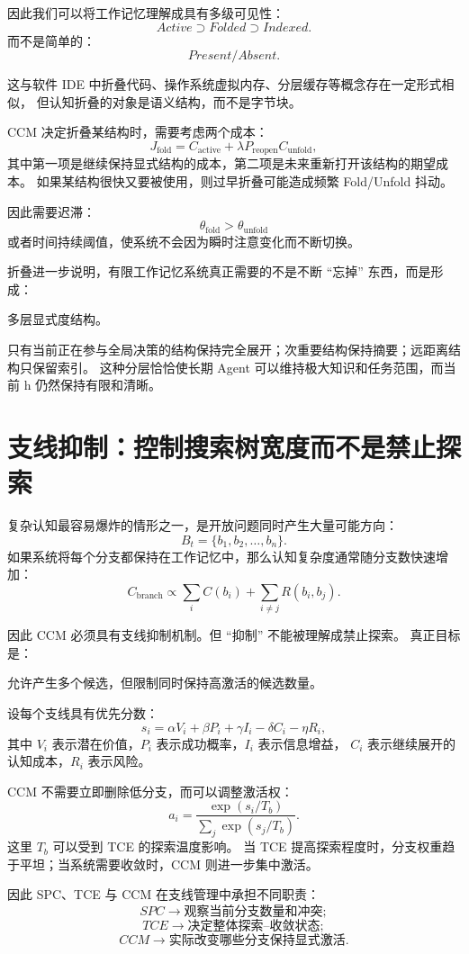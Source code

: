 因此我们可以将工作记忆理解成具有多级可见性：
\[
Active
\supset
Folded
\supset
Indexed.
\]
而不是简单的：
\[
Present/Absent.
\]

这与软件 IDE 中折叠代码、操作系统虚拟内存、分层缓存等概念存在一定形式相似，
但认知折叠的对象是语义结构，而不是字节块。

CCM 决定折叠某结构时，需要考虑两个成本：
\[
J_{\mathrm{fold}}
=
C_{\mathrm{active}}
+
\lambda P_{\mathrm{reopen}}C_{\mathrm{unfold}},
\]
其中第一项是继续保持显式结构的成本，第二项是未来重新打开该结构的期望成本。
如果某结构很快又要被使用，则过早折叠可能造成频繁 Fold/Unfold 抖动。

因此需要迟滞：
\[
\theta_{\mathrm{fold}}
>
\theta_{\mathrm{unfold}}
\]
或者时间持续阈值，使系统不会因为瞬时注意变化而不断切换。

折叠进一步说明，有限工作记忆系统真正需要的不是不断 ``忘掉'' 东西，而是形成：
\begin{statementbox}
多层显式度结构。
\end{statementbox}
只有当前正在参与全局决策的结构保持完全展开；次重要结构保持摘要；远距离结构只保留索引。
这种分层恰恰使长期 Agent 可以维持极大知识和任务范围，而当前 h 仍然保持有限和清晰。


\section{支线抑制：控制搜索树宽度而不是禁止探索}

复杂认知最容易爆炸的情形之一，是开放问题同时产生大量可能方向：
\[
B_t
=
\{b_1,b_2,\ldots,b_n\}.
\]
如果系统将每个分支都保持在工作记忆中，那么认知复杂度通常随分支数快速增加：
\[
C_{\mathrm{branch}}
\propto
\sum_i C(b_i)
+
\sum_{i\neq j}R(b_i,b_j).
\]

因此 CCM 必须具有支线抑制机制。但 ``抑制'' 不能被理解成禁止探索。
真正目标是：
\begin{statementbox}
允许产生多个候选，但限制同时保持高激活的候选数量。
\end{statementbox}

设每个支线具有优先分数：
\[
s_i
=
\alpha V_i
+
\beta P_i
+
\gamma I_i
-
\delta C_i
-
\eta R_i,
\]
其中 $V_i$ 表示潜在价值，$P_i$ 表示成功概率，$I_i$ 表示信息增益，
$C_i$ 表示继续展开的认知成本，$R_i$ 表示风险。

CCM 不需要立即删除低分支，而可以调整激活权：
\[
a_i
=
\frac{
\exp(s_i/T_b)
}{
\sum_j\exp(s_j/T_b)
}.
\]
这里 $T_b$ 可以受到 TCE 的探索温度影响。
当 TCE 提高探索程度时，分支权重趋于平坦；当系统需要收敛时，CCM 则进一步集中激活。

因此 SPC、TCE 与 CCM 在支线管理中承担不同职责：
\[
SPC
\rightarrow
\text{观察当前分支数量和冲突};
\]
\[
TCE
\rightarrow
\text{决定整体探索--收敛状态};
\]
\[
CCM
\rightarrow
\text{实际改变哪些分支保持显式激活}.
\]

